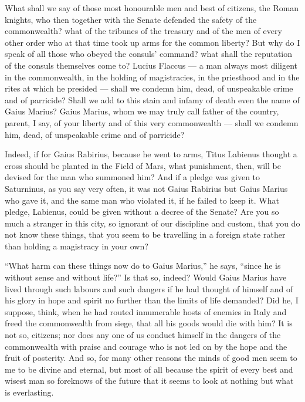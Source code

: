  What shall we say of those most honourable men and best of citizens, the Roman knights, who then together with the Senate defended the safety of the commonwealth? what of the tribunes of the treasury and of the men of every other order who at that time took up arms for the common liberty? But why do I speak of all those who obeyed the consuls' command? what shall the reputation of the consuls themselves come to? Lucius Flaccus --- a man always most diligent in the commonwealth, in the holding of magistracies, in the priesthood and in the rites at which he presided --- shall we condemn him, dead, of unspeakable crime and of parricide? Shall we add to this stain and infamy of death even the name of Gaius Marius? Gaius Marius, whom we may truly call father of the country, parent, I say, of your liberty and of this very commonwealth --- shall we condemn him, dead, of unspeakable crime and of parricide?

 Indeed, if for Gaius Rabirius, because he went to arms, Titus Labienus thought a cross should be planted in the Field of Mars, what punishment, then, will be devised for the man who summoned him? And if a pledge was given to Saturninus, as you say very often, it was not Gaius Rabirius but Gaius Marius who gave it, and the same man who violated it, if he failed to keep it. What pledge, Labienus, could be given without a decree of the Senate? Are you so much a stranger in this city, so ignorant of our discipline and custom, that you do not know these things, that you seem to be travelling in a foreign state rather than holding a magistracy in your own?

 ``What harm can these things now do to Gaius Marius,'' he says, ``since he is without sense and without life?'' Is that so, indeed? Would Gaius Marius have lived through such labours and such dangers if he had thought of himself and of his glory in hope and spirit no further than the limits of life demanded? Did he, I suppose, think, when he had routed innumerable hosts of enemies in Italy and freed the commonwealth from siege, that all his goods would die with him? It is not so, citizens; nor does any one of us conduct himself in the dangers of the commonwealth with praise and courage who is not led on by the hope and the fruit of posterity. And so, for many other reasons the minds of good men seem to me to be divine and eternal, but most of all because the spirit of every best and wisest man so foreknows of the future that it seems to look at nothing but what is everlasting.

